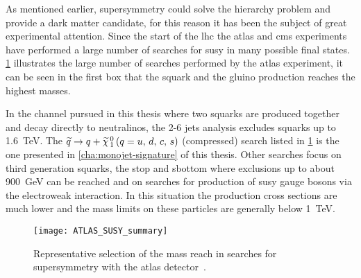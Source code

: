 As mentioned earlier, supersymmetry could solve the hierarchy problem and
provide a dark matter candidate, for this reason it has been the subject of
great experimental attention. Since the start of the \gls{lhc} the \gls{atlas}
and \gls{cms} experiments have performed a large number of searches for
\gls{susy} in many possible final states. \cref{fig:atlas_susy_summary}
illustrates the large number of searches performed by the \gls{atlas}
experiment, it can be seen in the first box that the squark and the gluino
production reaches the highest masses.

In the channel pursued in this thesis where two squarks are produced together
and decay directly to neutralinos, the 2-6 jets analysis excludes squarks up to
1.6~TeV. The $\widetilde{q} \rightarrow q + \widetilde{\chi}_{\, 1}^{\, 0}\, (q = u,\, d,\, c,\, s)$ (compressed) search listed in
\cref{fig:atlas_susy_summary} is the one presented in
\cref{cha:monojet-signature} of this thesis. Other searches focus on third
generation squarks, the stop and sbottom where exclusions up to about 900~GeV
can be reached and on searches for production of \gls{susy} gauge bosons via the
electroweak interaction. In this situation the production cross sections are
much lower and the mass limits on these particles are generally below 1~TeV.
\begin{figure}[!htb]
  \centering
  \texttt{[image: ATLAS\_SUSY\_summary]}
  \caption{Representative selection of the mass reach in searches for
    supersymmetry with the \gls{atlas} detector~\cite{SUSYSummaryPlots}.}
  \label{fig:atlas_susy_summary}
\end{figure}
